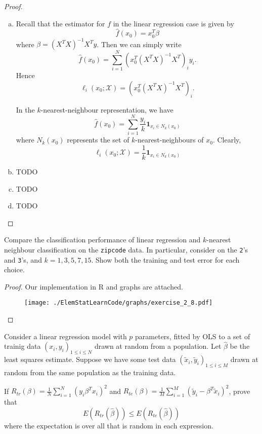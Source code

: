 \begin{proof}
    \begin{enumerate}[(a)]
        \item Recall that the estimator for $f$ in the linear regression case is given by \[
            \hat f(x_0) = x_0^T \beta 
        \] where $\beta = (X^T X)^{-1} X^T y$.  Then we can simply write \[
            \hat f(x_0) = \sum_{i=1}^N \left( x_0^T (X^T X)^{-1} X^T \right)_i y_i.
        \]  Hence \[
            \ell_i(x_0; \mathcal X) = \left( x_0^T (X^T X)^{-1} X^T \right)_i.
        \]
        
        In the $k$-nearest-neighbour representation, we have \[
            \hat f(x_0) = \sum_{i=1}^N \frac{y_i}{k} \mathbf{1}_{x_i \in N_k(x_0)}
        \] where $N_k(x_0)$ represents the set of $k$-nearest-neighbours of $x_0$.  Clearly, \[
            \ell_i(x_0; \mathcal X) = \frac{1}{k} \mathbf{1}_{x_i \in N_k(x_0)}
        \]
        \item TODO
        \item TODO
        \item TODO
    \end{enumerate}
\end{proof}

\begin{exer}
    Compare the classification performance of linear regression and $k$-nearest neighbour classification on the \texttt{zipcode} data.  In particular, consider on the \texttt{2}'s and \texttt{3}'s, and $k = 1, 3, 5, 7, 15$.  Show both the training and test error for each choice.
\end{exer}

\begin{proof}    
Our implementation in R and graphs are attached.

\clearpage


\clearpage
\begin{figure}
\centering\texttt{[image: ./ElemStatLearnCode/graphs/exercise\_2\_8.pdf]}
\end{figure}

\end{proof}

\begin{exer}
    Consider a linear regression model with $p$ parameters, fitted by OLS to a set of trainig data $(x_i, y_i)_{1 \leq i \leq N}$ drawn at random from a population.  Let $\hat \beta$ be the least squares estimate.  Suppose we have some test data $(\tilde x_i, \tilde y_i)_{1 \leq i \leq M}$ drawn at random from the same population as the training data.
    
    If $R_{tr}(\beta) = \frac{1}{N} \sum_{i=1}^N \left(y_i \beta^T x_i \right)^2$ and $R_{te}(\beta) = \frac{1}{M} \sum_{i=1}^M \left( \tilde y_i - \beta^T \tilde x_i \right)^2$, prove that \[
        E(R_{tr}(\hat \beta)) \leq E(R_{te}(\hat \beta))
    \] where the expectation is over all that is random in each expression.
\end{exer}
